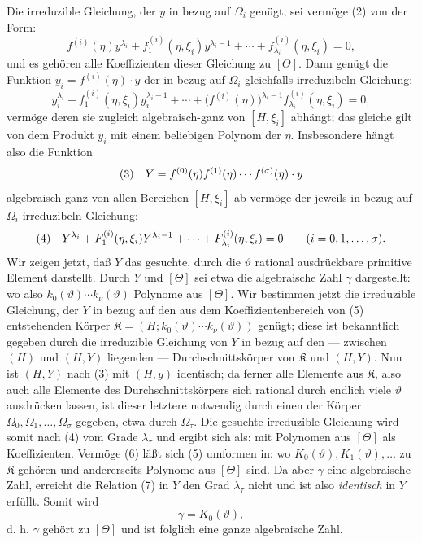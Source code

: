 Die irreduzible Gleichung, der $y$ in bezug auf $\Omega_i$ genügt, sei vermöge
(2) von der Form:
\[
 f^{(i)}(\eta)y^{\lambda_i}+f_1^{(i)}(\eta,\xi_i)y^{\lambda_i-1}
+\cdots+f_{\lambda_i}^{(i)}(\eta,\xi_i)=0,
\]
und es gehören alle Koeffizienten dieser Gleichung zu $[\Theta]$. Dann genügt
die Funktion $y_i=f^{(i)}(\eta)\cdot y$ der in bezug auf $\Omega_i$ gleichfalls
irreduzibeln Gleichung:
\[
 y_i^{\lambda_i}+f_1^{(i)}(\eta,\xi_i)y_i^{\lambda_i-1}
+\cdots+\bigl(f^{(i)}(\eta)\bigr)^{\lambda_i-1}
 f_{\lambda_i}^{(i)}(\eta,\xi_i)=0,
\]
vermöge deren sie zugleich algebraisch-ganz von $[H,\xi_i]$ abhängt; das
gleiche gilt von dem Produkt $y_i$ mit einem beliebigen Polynom der $\eta$.
Insbesondere hängt also die Funktion
\[
\begin{array}{@{}l@{\quad}l@{}}
(3)& \displaystyle Y=f^{(0)}(\eta)f^{(1)}(\eta)\cdots f^{(\sigma)}(\eta)\cdot y
\end{array}
\]
algebraisch-ganz von allen Bereichen $[H,\xi_i]$ ab vermöge der jeweils in bezug
auf $\Omega_i$ irreduzibeln Gleichung:
\[
\begin{array}{@{}l@{\quad}l@{}}
(4)& \displaystyle Y^{\lambda_i}+F_1^{(i)}(\eta,\xi_i)Y^{\lambda_i-1}
+\cdots+F_{\lambda_i}^{(i)}(\eta,\xi_i)=0
\qquad (i=0,1,\ldots,\sigma).
\end{array}
\]
Wir zeigen jetzt, daß $Y$ das gesuchte, durch die $\vartheta$ rational
ausdrückbare primitive Element darstellt. Durch $Y$ und $[\Theta]$ sei etwa die
algebraische Zahl $\gamma$ dargestellt:
wo also $k_0(\vartheta)\cdots k_\nu(\vartheta)$ Polynome aus $[\Theta]$. Wir
bestimmen jetzt die irreduzible Gleichung, der $Y$ in bezug auf den aus dem
Koeffizientenbereich von (5) entstehenden Körper
$\mathfrak K=(H;k_0(\vartheta)\cdots k_\nu(\vartheta))$ genügt; diese ist
bekanntlich gegeben durch die irreduzible Gleichung von $Y$ in bezug auf den
--- zwischen $(H)$ und $(H,Y)$ liegenden --- Durchschnittskörper von
$\mathfrak K$ und $(H,Y)$. Nun ist $(H,Y)$ nach (3) mit $(H,y)$ identisch; da
ferner alle Elemente aus $\mathfrak K$, also auch alle Elemente des
Durchschnittskörpers sich rational durch endlich viele $\vartheta$ ausdrücken
lassen, ist dieser letztere notwendig durch einen der Körper
$\Omega_0,\Omega_1,\ldots,\Omega_\sigma$ gegeben, etwa durch $\Omega_\tau$.
Die gesuchte irreduzible Gleichung wird somit nach (4) vom Grade
$\lambda_\tau$ und ergibt sich als:
mit Polynomen aus $[\Theta]$ als Koeffizienten. Vermöge (6) läßt sich (5)
umformen in:
wo $K_0(\vartheta),K_1(\vartheta),\ldots$ zu $\mathfrak K$ gehören und
andererseits Polynome aus $[\Theta]$ sind. Da aber $\gamma$ eine algebraische
Zahl, erreicht die Relation (7) in $Y$ den Grad $\lambda_\tau$ nicht und ist
also \emph{identisch} in $Y$ erfüllt. Somit wird
\[
 \gamma=K_0(\vartheta),
\]
d. h. $\gamma$ gehört zu $[\Theta]$ und ist folglich eine ganze algebraische
Zahl.

